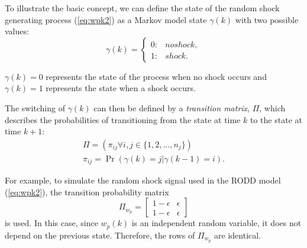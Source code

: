To illustrate the basic concept, we can define the state of the random shock generating process (\ref{eq:wpk2}) as a Markov model state $\gamma(k)$ with two possible values:
\begin{equation} \label{eq:gamma-k}
	\gamma(k) = 
	\begin{cases*}
		0: & no shock, \\
		1: & shock.
	\end{cases*}
\end{equation}

$\gamma(k)=0$ represents the state of the process when no shock occurs and $\gamma(k)=1$ represents the state when a shock occurs.

The switching of $\gamma(k)$ can then be defined by a \textit{transition matrix}, $\Pi$, which describes the probabilities of transitioning from the state at time $k$ to the state at time $k+1$:
\begin{equation} \label{eq:Pi}
	\begin{split}
	\Pi = \left(\pi_{ij} \forall i,j\in \{1,2,...,n_j\}\right) \\
	\pi_{ij}=\Pr\left(\gamma(k)=j|\gamma(k-1)=i\right).
	\end{split}
\end{equation}

For example, to simulate the random shock signal used in the RODD model (\ref{eq:wpk2}), the transition probability matrix
\begin{equation} \label{eq:Pi-RODD-step}
	\Pi_{w_{p}} = \begin{bmatrix}
	1-\epsilon & \epsilon \\
	1-\epsilon & \epsilon
	\end{bmatrix}
\end{equation}
is used. In this case, since $w_{p}(k)$ is an independent random variable, it does not depend on the previous state. Therefore, the rows of $\Pi_{w_{p}}$ are identical.

